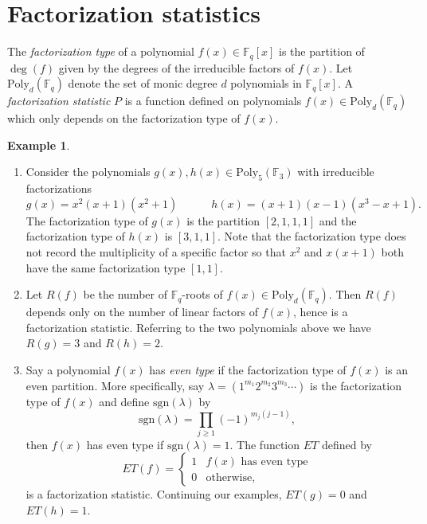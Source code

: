 \documentclass[submission]{FPSAC2018}
\theoremstyle{definition}
\newtheorem{example}[thm]{Example}
\numberwithin{equation}{section}
\def\FF{\mathbb{F}}
\def\sgn{\mathrm{sgn}}
\newcommand{\poly}{\mathrm{Poly}}
\begin{document}
\section{Factorization statistics}
\label{section fact}
The \emph{factorization type} of a polynomial $f(x) \in \FF_q[x]$ is the partition of $\deg(f)$ given by the degrees of the irreducible factors of $f(x)$. Let $\poly_d(\FF_q)$ denote the set of monic degree $d$ polynomials in $\FF_q[x]$. A \emph{factorization statistic} $P$ is a function defined on polynomials $f(x) \in \poly_d(\FF_q)$ which only depends on the factorization type of $f(x)$.

\begin{example}\hspace{.1in}

\label{ex 1}
\begin{enumerate}[leftmargin=*]
    \item Consider the polynomials $g(x), h(x) \in \poly_5(\FF_3)$ with irreducible factorizations
    \[
        g(x) = x^2(x+1)(x^2 + 1) \hspace{3em} h(x) = (x+1)(x - 1)(x^3 - x + 1).
    \]
    The factorization type of $g(x)$ is the partition $[2,1,1,1]$ and the factorization type of $h(x)$ is $[3,1,1]$. Note that the factorization type does not record the multiplicity of a specific factor so that $x^2$ and $x(x + 1)$ both have the same factorization type $[1,1]$.
    
    \item Let $R(f)$ be the number of $\FF_q$-roots of $f(x)\in \poly_d(\FF_q)$. Then $R(f)$ depends only on the number of linear factors of $f(x)$, hence is a factorization statistic. Referring to the two polynomials above we have $R(g) = 3$ and $R(h) = 2$.
    
    \item Say a polynomial $f(x)$ has \emph{even type} if the factorization type of $f(x)$ is an even partition. More specifically, say $\lambda = (1^{m_1} 2^{m_2} 3^{m_3}\cdots )$ is the factorization type of $f(x)$ and define $\sgn(\lambda)$ by
    \[
        \sgn(\lambda) = \prod_{j\geq 1} (-1)^{m_j(j - 1)},
    \]
    then $f(x)$ has even type if $\sgn(\lambda) = 1$. The function $ET$ defined by
    \[
        ET(f) = \begin{cases} 1 & \text{$f(x)$ has even type}\\ 0 & \text{otherwise,}\end{cases}
    \]
    is a factorization statistic. Continuing our examples, $ET(g) = 0$ and $ET(h) = 1$.
    

\end{enumerate}
\end{example}
\end{document}
